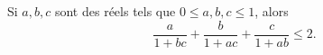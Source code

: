 Si $a, b, c$ sont des réels tels que $0 \leq a, b, c \leq 1$, alors
\[ \frac{a}{1 + bc} + \frac{b}{1 + ac} + \frac{c}{1 + ab} \leq 2. \]
